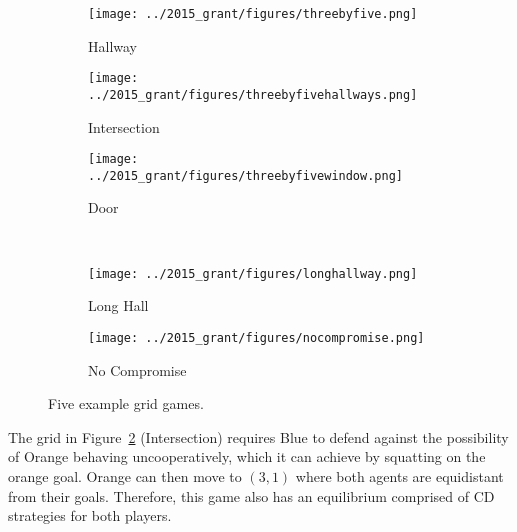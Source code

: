 \begin{figure}
\centering
\begin{subfigure}{.3\textwidth}
\centering
\texttt{[image: ../2015\_grant/figures/threebyfive.png]}
\caption{Hallway}
\label{fig:hallway}
\end{subfigure}
\begin{subfigure}{.3\textwidth}
\centering
\texttt{[image: ../2015\_grant/figures/threebyfivehallways.png]}
\caption{Intersection}
\label{fig:intersection}
\end{subfigure}
\begin{subfigure}{.3\textwidth}
\centering
\texttt{[image: ../2015\_grant/figures/threebyfivewindow.png]}
\caption{Door}
\label{fig:door}
\end{subfigure} \\ [2.5ex]
\begin{subfigure}{.367\textwidth}
\centering
\texttt{[image: ../2015\_grant/figures/longhallway.png]}
\caption{Long Hall}
\label{fig:longhallway}
\end{subfigure}
\begin{subfigure}{.367\textwidth}
\centering
\texttt{[image: ../2015\_grant/figures/nocompromise.png]}
\caption{No Compromise}
\label{fig:nocompromise}
\end{subfigure}
\caption{Five example grid games.}
\end{figure}

The grid in Figure~\ref{fig:intersection} (Intersection) requires Blue
to defend against the possibility of Orange behaving uncooperatively,
which it can achieve by squatting on the orange goal.  Orange can then
move to $(3,1)$ where both agents are equidistant from their goals.
Therefore, this game also has an equilibrium comprised of CD strategies
for both players.  

